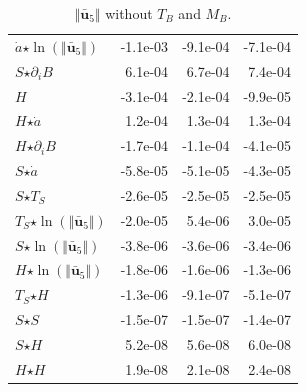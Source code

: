 \begin{table}[H]
\begin{tabular}{l|r|r|r}
  $\dot{a}$$ \star $$\ln\left( \Vert \bar{\mathbf{u}}_{5} \Vert \right)$ & -1.1e-03 & -9.1e-04 & -7.1e-04 \\
  $S$$ \star $$\partial_i B$ & 6.1e-04 & 6.7e-04 & 7.4e-04 \\
  $H$ & -3.1e-04 & -2.1e-04 & -9.9e-05 \\
  $H$$ \star $$\dot{a}$ & 1.2e-04 & 1.3e-04 & 1.3e-04 \\
  $H$$ \star $$\partial_i B$ & -1.7e-04 & -1.1e-04 & -4.1e-05 \\
  $S$$ \star $$\dot{a}$ & -5.8e-05 & -5.1e-05 & -4.3e-05 \\
  $S$$ \star $$T_S$ & -2.6e-05 & -2.5e-05 & -2.5e-05 \\
  \color{red}$T_S$$ \star $$\ln\left( \Vert \bar{\mathbf{u}}_{5} \Vert \right)$ & \color{red}-2.0e-05 & \color{red}5.4e-06 & \color{red}3.0e-05 \\
  $S$$ \star $$\ln\left( \Vert \bar{\mathbf{u}}_{5} \Vert \right)$ & -3.8e-06 & -3.6e-06 & -3.4e-06 \\
  $H$$ \star $$\ln\left( \Vert \bar{\mathbf{u}}_{5} \Vert \right)$ & -1.8e-06 & -1.6e-06 & -1.3e-06 \\
  $T_S$$ \star $$H$ & -1.3e-06 & -9.1e-07 & -5.1e-07 \\
  $S$$ \star $$S$ & -1.5e-07 & -1.5e-07 & -1.4e-07 \\
  $S$$ \star $$H$ & 5.2e-08 & 5.6e-08 & 6.0e-08 \\
  $H$$ \star $$H$ & 1.9e-08 & 2.1e-08 & 2.4e-08 \\
\end{tabular}
  \caption[]{\normalsize $\Vert \mathbf{\bar{u}}_5 \Vert$ without $T_B$ and $M_B$.}
\end{table}

\newpage

